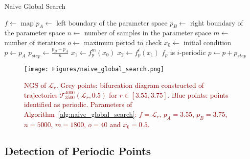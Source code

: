 \begin{algorithm}[!h]
    \caption{Naive Global Search}
    \label{alg:naive_global_search}
    \begin{algorithmic}[1]
        \Statex $f \gets$ map
        \Statex $p_{A} \gets$ left boundary of the parameter space
        \Statex $p_{B} \gets$ right boundary of the parameter space
        \Statex $n \gets$ number of samples in the parameter space
        \Statex $m \gets$ number of iterations
        \Statex $o \gets$ maximum period to check
        \Statex $x_0 \gets$ initial condition
        \State $p \gets p_{A}$
        \State $p_{step} \gets \frac{p_{B} - p_{A}}{n}$
            \State $x_1 \gets f_{p}^{m}(x_0)$
                \State $x_2 \gets f_{p}^{i}(x_1)$
                    \State $f_p$ is $i$-periodic
                \EndIf
            \EndFor
            \State $p \gets p + p_{step}$
        \EndWhile
    \end{algorithmic}
\end{algorithm}

\begin{figure}[!h]
    \centering
    \texttt{[image: Figures/naive\_global\_search.png]}
    \caption{
        \textcolor{darkred}{
        NGS of $\mathcal{L}_{r}$.
        Grey points: bifurcation diagram constructed of trajectories $\mathcal{T}_{3500}^{4000}(\mathcal{L}_{r}, 0.5)$ for $r \in [3.55, 3.75]$.
        Blue points: points identified as periodic. 
        Parameters of Algorithm~\ref{alg:naive_global_search}: $f = \mathcal{L}_{r}$, $p_{A} = 3.55$, $p_{B} = 3.75$, $n=5000$, $m=1800$, $o=40$ and $x_0 = 0.5$.
        }
    }
    \label{fig:naive_global_search}
\end{figure}

\subsection{Detection of Periodic Points}
\label{subsec: detection_of_periodic_points}


